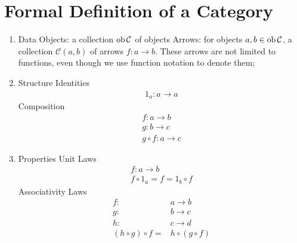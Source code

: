 \setcounter{section}{7}
\section{Formal Definition of a Category}
\begin{enumerate}
    \item Data
        \subitem Objects: a collection $\text{ob}\thinspace\mathcal{C}{}$ of objects
        \subitem Arrows: for objects $a, b\in \text{ob}\thinspace\mathcal{C}{}$, a collection
        $\mathcal{C}(a, b)$ of arrows $f: a\rightarrow b$. These arrows are not
        limited to functions, even though we use function notation to denote
        them;
    \item Structure
        \subitem Identities
        \begin{align*}
        1_a : a \rightarrow a
        \end{align*}
        \subitem Composition
        \begin{align*}
        f: a\rightarrow b\\
        g: b\rightarrow c\\
        g\circ f: a\rightarrow c
        \end{align*}
    \item Properties
        \subitem Unit Laws
        \begin{align*}
        f: a\rightarrow b\\
        f\circ 1_a = f = 1_b \circ f
        \end{align*}
        \subitem Associativity Laws
        \begin{align*}
            f:& a\rightarrow b\\
            g:& b\rightarrow c\\
            h:& c\rightarrow d\\
            (h\circ g)\circ f=&h\circ (g \circ f)
        \end{align*}
\end{enumerate}

